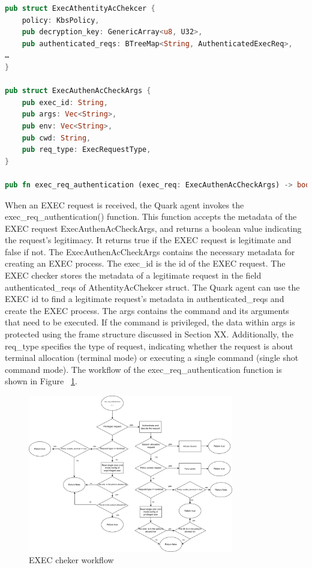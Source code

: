 \begin{lstlisting}[language=rust, caption= API of EXEC checker, label={lst:exec_Cheker}]
pub struct ExecAthentityAcChekcer {
    policy: KbsPolicy,
    pub decryption_key: GenericArray<u8, U32>,
    pub authenticated_reqs: BTreeMap<String, AuthenticatedExecReq>,
…
}

pub struct ExecAuthenAcCheckArgs {
    pub exec_id: String,
    pub args: Vec<String>,
    pub env: Vec<String>,
    pub cwd: String,
    pub req_type: ExecRequestType,
}

pub fn exec_req_authentication (exec_req: ExecAuthenAcCheckArgs) -> bool
\end{lstlisting}


When an EXEC request is received, the Quark agent invokes the exec\_req\_authentication() function. This function accepts the metadata of the EXEC request ExecAuthenAcCheckArgs, and returns a boolean value indicating the request's legitimacy. It returns true if the EXEC request is legitimate and false 
if not. The ExecAuthenAcCheckArgs contains the necessary metadata for creating an EXEC process. The exec\_id is the id of the EXEC request. The EXEC checker stores the metadata of a legitimate request in the field authenticated\_reqs of AthentityAcChekcer struct. The Quark agent can use the EXEC id to 
find a legitimate request's metadata in authenticated\_reqs and create the EXEC process. The args contains the command and its arguments that need to be executed. If the command is privileged, the data within args is protected using the frame structure discussed in Section XX. Additionally, the
req\_type specifies the type of request, indicating whether the request is about terminal allocation (terminal mode) or executing a single command (single shot command mode). The workflow of the exec\_req\_authentication function is shown in Figure ~\ref{fig:exec_req_authentication_flow_chart}.


\begin{figure}[htp]
    \centering
    \includegraphics[width=0.8\textwidth]{images/exec_req_authentication_flow_chart.png}
    \caption[EXEC cheker workflow]{EXEC cheker workflow}
    \label{fig:exec_req_authentication_flow_chart}
\end{figure}


